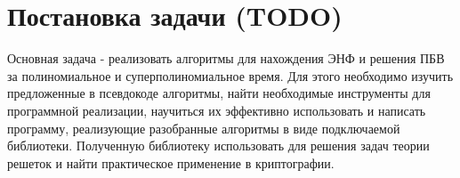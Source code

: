 \newpage

\section{Постановка задачи (TODO)}

Основная задача - реализовать алгоритмы для нахождения ЭНФ и решения ПБВ за полиномиальное и суперполиномиальное время. Для этого необходимо изучить предложенные в псевдокоде алгоритмы, найти необходимые инструменты для программной реализации, научиться их эффективно использовать и написать программу, реализующие разобранные алгоритмы в виде подключаемой библиотеки. Полученную библиотеку использовать для решения задач теории решеток и найти практическое применение в криптографии.

\clearpage